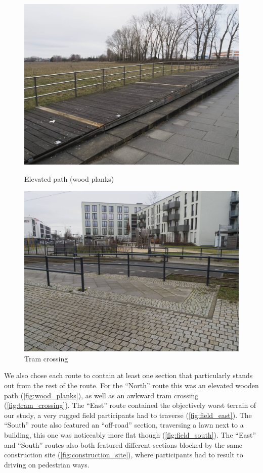 \begin{figure}[!htb]
    \centering
    \begin{minipage}{.5\textwidth}
        \centering
        \includegraphics[width=.9333\linewidth]{images/wood_planks_path.jpg}
        \caption{Elevated path (wood planks)}
        \label{fig:wood_planks}
    \end{minipage}%
    \begin{minipage}{.5\textwidth}
        \centering
        \includegraphics[width=.9333\linewidth]{images/tram_crossing.jpg}
        \caption{Tram crossing}
        \label{fig:tram_crossing}
    \end{minipage}
\end{figure}

\bigbreak\noindent
We also chose each route to contain at least one section that particularly stands out from the rest of the route.
For the “North” route this was an elevated wooden path (\autoref{fig:wood_planks}), as well as an awkward tram crossing (\autoref{fig:tram_crossing}).
The “East” route contained the objectively worst terrain of our study, a very rugged field participants had to traverse (\autoref{fig:field_east}).
The “South” route also featured an “off-road” section, traversing a lawn next to a building, this one was noticeably more flat though (\autoref{fig:field_south}).
The “East” and “South” routes also both featured different sections blocked by the same construction site (\autoref{fig:construction_site}), where participants had to result to driving on pedestrian ways.

